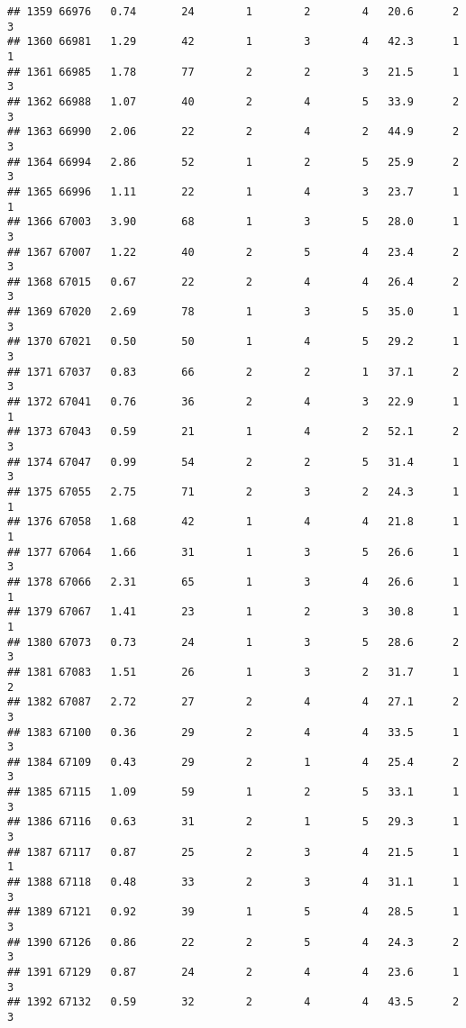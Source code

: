 \documentclass[
]{article}
\begin{document}
\begin{verbatim}
## 1359 66976   0.74       24        1        2        4   20.6      2      3
## 1360 66981   1.29       42        1        3        4   42.3      1      1
## 1361 66985   1.78       77        2        2        3   21.5      1      3
## 1362 66988   1.07       40        2        4        5   33.9      2      3
## 1363 66990   2.06       22        2        4        2   44.9      2      3
## 1364 66994   2.86       52        1        2        5   25.9      2      3
## 1365 66996   1.11       22        1        4        3   23.7      1      1
## 1366 67003   3.90       68        1        3        5   28.0      1      3
## 1367 67007   1.22       40        2        5        4   23.4      2      3
## 1368 67015   0.67       22        2        4        4   26.4      2      3
## 1369 67020   2.69       78        1        3        5   35.0      1      3
## 1370 67021   0.50       50        1        4        5   29.2      1      3
## 1371 67037   0.83       66        2        2        1   37.1      2      3
## 1372 67041   0.76       36        2        4        3   22.9      1      1
## 1373 67043   0.59       21        1        4        2   52.1      2      3
## 1374 67047   0.99       54        2        2        5   31.4      1      3
## 1375 67055   2.75       71        2        3        2   24.3      1      1
## 1376 67058   1.68       42        1        4        4   21.8      1      1
## 1377 67064   1.66       31        1        3        5   26.6      1      3
## 1378 67066   2.31       65        1        3        4   26.6      1      1
## 1379 67067   1.41       23        1        2        3   30.8      1      1
## 1380 67073   0.73       24        1        3        5   28.6      2      3
## 1381 67083   1.51       26        1        3        2   31.7      1      2
## 1382 67087   2.72       27        2        4        4   27.1      2      3
## 1383 67100   0.36       29        2        4        4   33.5      1      3
## 1384 67109   0.43       29        2        1        4   25.4      2      3
## 1385 67115   1.09       59        1        2        5   33.1      1      3
## 1386 67116   0.63       31        2        1        5   29.3      1      3
## 1387 67117   0.87       25        2        3        4   21.5      1      1
## 1388 67118   0.48       33        2        3        4   31.1      1      3
## 1389 67121   0.92       39        1        5        4   28.5      1      3
## 1390 67126   0.86       22        2        5        4   24.3      2      3
## 1391 67129   0.87       24        2        4        4   23.6      1      3
## 1392 67132   0.59       32        2        4        4   43.5      2      3

\end{verbatim}
\end{document}
